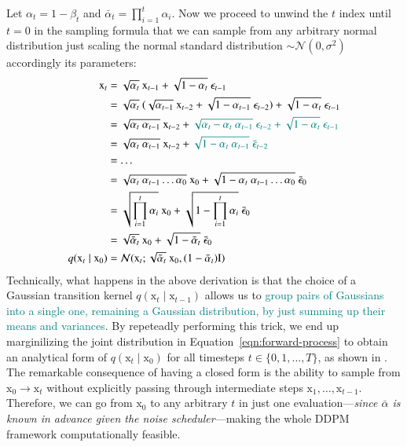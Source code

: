 Let $\alpha_{t}=1 - \beta_{t}$ and $\bar{\alpha}_{t}=\prod_{i=1}^{t}\alpha_{i}$. Now we proceed to unwind the $t$ index until $t=0$ in the sampling formula
that we can sample from any arbitrary normal distribution just scaling the
normal standard distribution $\sim \mathcal{N}(0, \sigma^2)$ accordingly its
parameters:
\begin{equation}\label{reparameterization-trick}
    \begin{split}
            \mathrm{x}_{t} & = \sqrt{\alpha_{t}}~\mathrm{x}_{t-1} + \sqrt{1-\alpha_{t}}~\epsilon_{t-1} \\
             & = \sqrt{\alpha_{t}}~(\sqrt{\alpha_{t-1}}~\mathrm{x}_{t-2} + \sqrt{1 - \alpha_{t-1}}~\epsilon_{t-2}) + \sqrt{1-\alpha_{t}}~\epsilon_{t-1} \\
             &= \sqrt{\alpha_{t}~\alpha_{t-1}}~\mathrm{x}_{t-2} + \textcolor{teal}{\sqrt{\alpha_{t} - \alpha_{t}~\alpha_{t-1}}~\epsilon_{t-2} + \sqrt{1-\alpha_{t}}~\epsilon_{t-1}} \\
             &= \sqrt{\alpha_{t}~\alpha_{t-1}}~\mathrm{x}_{t-2} + \textcolor{teal}{\sqrt{1 - \alpha_{t}~\alpha_{t-1}}~\bar{\epsilon}_{t-2}} \\
             &= \dots \\
             &= \sqrt{\alpha_{t}~\alpha_{t-1}\dots\alpha_{0}}~\mathrm{x}_{0} + \sqrt{1 - \alpha_{t}~\alpha_{t-1}\dots\alpha_{0}}~\bar{\epsilon}_{0} \\
             &= \sqrt{\prod_{i=1}^{t}\alpha_{i}}~\mathrm{x}_{0} + \sqrt{1 - \prod_{i=1}^{t}\alpha_{i}}~\bar{\epsilon}_{0} \\
             &= \sqrt{\bar{\alpha}_{t}}~\mathrm{x}_{0} + \sqrt{1 - \bar{\alpha}_
             {t}}~\bar{\epsilon}_{0} \\
            q(\mathrm{x}_{t}\mid \mathrm{x}_{0}) & = \mathcal{N}(\mathrm{x}_{t};\sqrt{\bar{\alpha}_{t}}~\mathrm{x}_{0}, (1-\bar{\alpha}_{t})\mathrm{I})
    \end{split}
\end{equation}
Technically, what happens in the above derivation is that the choice of a Gaussian transition kernel $q(\mathrm{x}_{t}\mid\mathrm{x}_{t-1})$ allows us to
\textcolor{teal}{group pairs of Gaussians into a single one, remaining a Gaussian distribution, by just summing up their means and variances}.  By repeteadly performing this trick, we end up marginilizing the joint distribution in Equation~\ref{eqn:forward-process} to obtain an analytical form of $q(\mathrm{x}_{t}\mid \mathrm{x}_{0})$ for all timesteps $t\in\{0, 1, \dots, T\}$, as shown in . The remarkable consequence of having a closed form is the ability to sample from $\mathrm{x}_{0}\rightarrow \mathrm{x}_{t}$ without explicitly passing through intermediate steps $\mathrm{x}_{1}, \dots, \mathrm{x}_{t-1}$. Therefore, we can go from $\mathrm{x}_{0}$ to any arbitrary $t$ in just one evaluation---\textit{since $\bar{\alpha}$ is known in advance given the noise scheduler}---making the whole DDPM framework computationally feasible.

